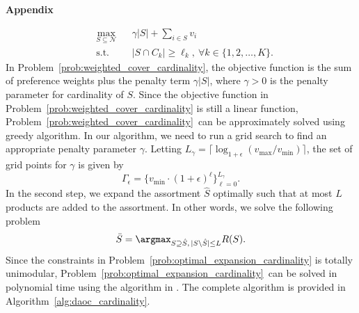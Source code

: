 \documentclass[msom,non-blindrev]{informs3} %
\theoremstyle{definition}
\begin{document}
\begin{appendices}{\Large \noindent\textbf{Appendix}}
{\begin{equation}
\label{prob:weighted_cover_cardinality}
\begin{aligned}
&\max_{S\subseteq\mathcal{N}}&&\gamma|S|+\sum_{i\in S}v_i\\
&\text{s.t.}&&|S\cap C_k|\geq \ell_k,\ \forall k\in\{1,2,\dots,K\}.
\end{aligned}
\end{equation}
In Problem~\eqref{prob:weighted_cover_cardinality}, the objective function is the sum of preference weights plus the penalty term $\gamma|S|$, where $\gamma>0$ is the penalty parameter for cardinality of $S$. Since the objective function in Problem~\eqref{prob:weighted_cover_cardinality} is still a linear function, Problem~\eqref{prob:weighted_cover_cardinality}~can be approximately solved using greedy algorithm. In our algorithm, we need to run a grid search to find an appropriate penalty parameter $\gamma$. Letting $L_\gamma=\lceil\log_{1+\epsilon}(v_{\max}/v_{\min})\rceil$, the set of grid points for $\gamma$ is given by
\begin{equation*}
\Gamma_\epsilon=\Big\{v_{\min}\cdot (1+\epsilon)^\ell\Big\}_{\ell=0}^{L_\gamma}.
\end{equation*}
In the second step, we expand the assortment $\hat{S}$ optimally such that at most $L$ products are added to the assortment. In other words, we solve the following problem
\begin{equation}\label{prob:optimal_expansion_cardinality}
\bar{S}=\argmax_{S\supseteq\hat{S},\,|S\backslash \hat{S}|\leq L} R(S).
\end{equation}
Since the constraints in Problem~\eqref{prob:optimal_expansion_cardinality} is totally unimodular, Problem~\eqref{prob:optimal_expansion_cardinality}~can be solved in polynomial time using the algorithm in \cite{sumida2021revenue}. The complete algorithm is provided in Algorithm~\ref{alg:daoc_cardinality}.


}
\end{appendices}
\end{document}
